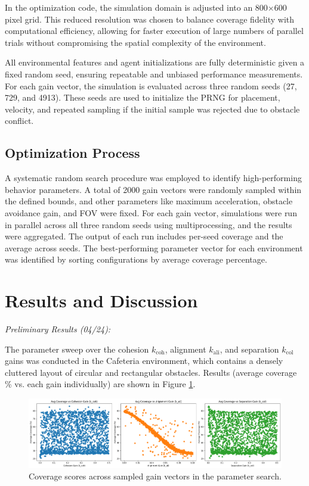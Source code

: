 \documentclass[12pt]{article}
\begin{document}
In the optimization code, the simulation domain is adjusted into an 800\(\times\)600 pixel grid. This reduced resolution was chosen to balance coverage fidelity with computational efficiency, allowing for faster execution of large numbers of parallel trials without compromising the spatial complexity of the environment.

All environmental features and agent initializations are fully deterministic given a fixed random seed, ensuring repeatable and unbiased performance measurements. For each gain vector, the simulation is evaluated across three random seeds (27, 729, and 4913). These seeds are used to initialize the PRNG for placement, velocity, and repeated sampling if the initial sample was rejected due to obstacle conflict.

\subsection{Optimization Process}

\sloppypar
A systematic random search procedure was employed to identify high-performing behavior parameters. A total of 2000 gain vectors were randomly sampled within the defined bounds, and other parameters like maximum acceleration, obstacle avoidance gain, and FOV were fixed. For each gain vector, simulations were run in parallel across all three random seeds using multiprocessing, and the results were aggregated. The output of each run includes per-seed coverage and the average across seeds. The best-performing parameter vector for each environment was identified by sorting configurations by average coverage percentage.

\section{Results and Discussion}

\emph{Preliminary Results (04/24):}

The parameter sweep over the cohesion \(k_\text{coh}\), alignment \(k_\text{ali}\), and separation \(k_\text{col}\) gains was conducted in the Cafeteria environment, which contains a densely cluttered layout of circular and rectangular obstacles. Results (average coverage \% vs. each gain individually) are shown in Figure \ref{fig:gains}.

\begin{figure}[h!]
\centering
\includegraphics[width=\linewidth]{gains.png}
\caption{Coverage scores across sampled gain vectors in the parameter search.}
\label{fig:gains}
\end{figure}
\end{document}
